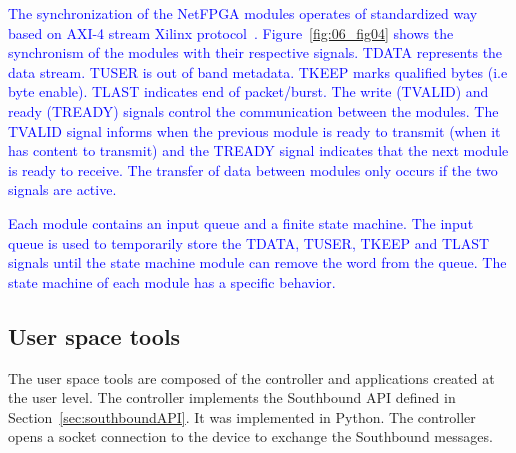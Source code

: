 \textcolor{blue}{The synchronization of the NetFPGA modules operates of standardized way based on AXI-4 stream Xilinx protocol~\cite{XilinxAXI4}. Figure~\ref{fig:06_fig04} shows the 
synchronism of the modules with their respective signals. TDATA represents the data stream. TUSER is out of band metadata. TKEEP marks qualified bytes (i.e byte enable). TLAST indicates end of packet/burst. The write (TVALID) and ready (TREADY) signals control the communication between the modules. The TVALID signal informs when the previous module is ready to transmit (when it has content to transmit) and the TREADY signal indicates that the next module is ready to receive. The transfer of data between modules only occurs if the two signals are active.} 

\textcolor{blue}{Each module contains an input queue and a finite state machine. The input queue is used to temporarily store the TDATA, TUSER, TKEEP  and TLAST signals until the state machine module can remove the word from the queue. The state machine of each module has a specific behavior.}

\subsection{User space tools}

\color{red}
The user space tools are composed of the controller and applications created at the user level.
The controller implements the Southbound API defined in Section~\ref{sec:southboundAPI}.
It was implemented in Python.
The controller opens a socket connection to the device to exchange the Southbound messages.


